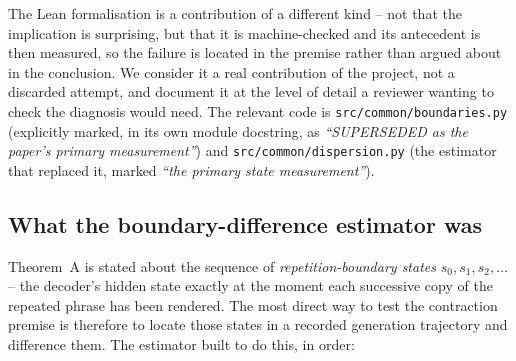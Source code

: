 \documentclass[11pt]{article}
\begin{document}
The Lean formalisation is a contribution of a different kind -- not that the
implication is surprising, but that it is machine-checked and its antecedent is
then measured, so the failure is located in the premise rather than argued about
in the conclusion. We consider it a real contribution of the project, not a
discarded attempt, and document it at the level of detail a reviewer wanting
to check the diagnosis would need. The relevant code is
\texttt{src/common/boundaries.py} (explicitly marked, in its own module
docstring, as \emph{``SUPERSEDED as the paper's primary measurement''}) and
\texttt{src/common/dispersion.py} (the estimator that replaced it, marked
\emph{``the primary state measurement''}).

\subsection{What the boundary-difference estimator was}

Theorem~A is stated about the sequence of \emph{repetition-boundary states}
$s_0, s_1, s_2, \dots$ -- the decoder's hidden state exactly at the moment
each successive copy of the repeated phrase has been rendered. The most
direct way to test the contraction premise is therefore to locate those
states in a recorded generation trajectory and difference them. The
estimator built to do this, in order:
\end{document}
